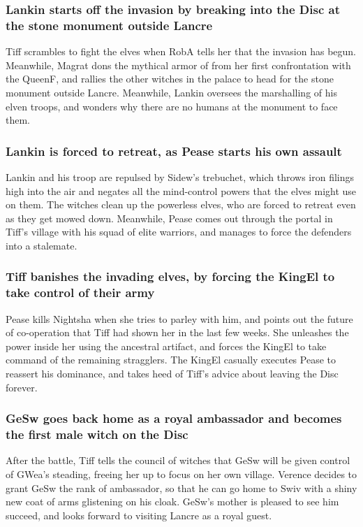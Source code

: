 \subsubsection{\Gls{Lankin} starts off the invasion by breaking into the Disc at the stone monument
    outside Lancre}
\Gls{Tiff} scrambles to fight the elves when \Gls{RobA} tells her that the invasion has begun.
Meanwhile, \Gls{Magrat} dons the mythical armor of from her first confrontation with the
\Gls{QueenF}, and rallies the other witches in the palace to head for the stone monument outside
Lancre. Meanwhile, \Gls{Lankin} oversees the marshalling of his elven troops, and wonders why there
are no humans at the monument to face them.

\subsubsection{\Gls{Lankin} is forced to retreat, as \Gls{Pease} starts his own assault}
\Gls{Lankin} and his troop are repulsed by \Gls{Sidew}'s trebuchet, which throws iron filings high
into the air and negates all the mind-control powers that the elves might use on them. The witches
clean up the powerless elves, who are forced to retreat even as they get mowed down. Meanwhile,
\Gls{Pease} comes out through the portal in \Gls{Tiff}'s village with his squad of elite warriors,
and manages to force the defenders into a stalemate.

\subsubsection{\Gls{Tiff} banishes the invading elves, by forcing the \Gls{KingEl} to take control
    of their army}
\Gls{Pease} kills \Gls{Nightsha} when she tries to parley with him, and points out the future of
co-operation that \Gls{Tiff} had shown her in the last few weeks. She unleashes the power inside her
using the ancestral artifact, and forces the \Gls{KingEl} to take command of the remaining
stragglers. The \Gls{KingEl} casually executes \Gls{Pease} to reassert his dominance, and takes heed
of \Gls{Tiff}'s advice about leaving the Disc forever.

\subsubsection{\Gls{GeSw} goes back home as a royal ambassador and becomes the first male witch on
    the Disc}
After the battle, \Gls{Tiff} tells the council of witches that \Gls{GeSw} will be given control of
\Gls{GWea}'s steading, freeing her up to focus on her own village. \Gls{Verence} decides to grant
\Gls{GeSw} the rank of ambassador, so that he can go home to \Gls{Swiv} with a shiny new coat of
arms glistening on his cloak. \Gls{GeSw}'s mother is pleased to see him succeed, and looks forward
to visiting Lancre as a royal guest.